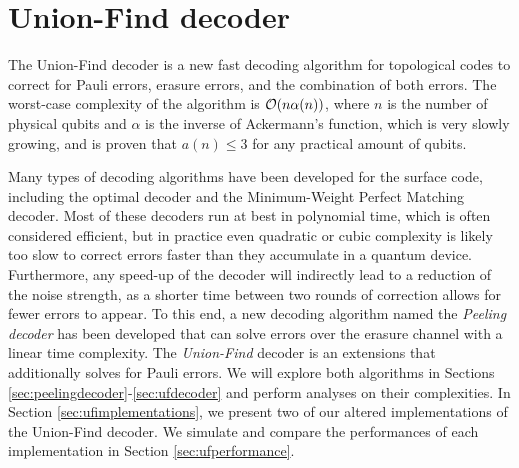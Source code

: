 \chapter{Union-Find decoder}\label{ch:UFdecoder}
The Union-Find decoder is a new fast decoding algorithm for topological codes to correct for Pauli errors, erasure errors, and the combination of both errors. The worst-case complexity of the algorithm is $\mathcal{O}(n\alpha(n))$, where $n$ is the number of physical qubits and $\alpha$ is the inverse of Ackermann's function, which is very slowly growing, and is proven that $a(n)\leq 3$ for any practical amount of qubits.

Many types of decoding algorithms have been developed for the surface code, including the optimal decoder and the Minimum-Weight Perfect Matching decoder. Most of these decoders run at best in polynomial time, which is often considered efficient, but in practice even quadratic or cubic complexity is likely too slow to correct errors faster than they accumulate in a quantum device. Furthermore, any speed-up of the decoder will indirectly lead to a reduction of the noise strength, as a shorter time between two rounds of correction allows for fewer errors to appear. To this end, a new decoding algorithm named the \emph{Peeling decoder} has been developed that can solve errors over the erasure channel with a linear time complexity. The \emph{Union-Find} decoder is an extensions that additionally solves for Pauli errors. We will explore both algorithms in Sections \ref{sec:peelingdecoder}-\ref{sec:ufdecoder} and perform analyses on their complexities. In Section \ref{sec:ufimplementations}, we present two of our altered implementations of the Union-Find decoder. We simulate and compare the performances of each implementation in Section \ref{sec:ufperformance}.

